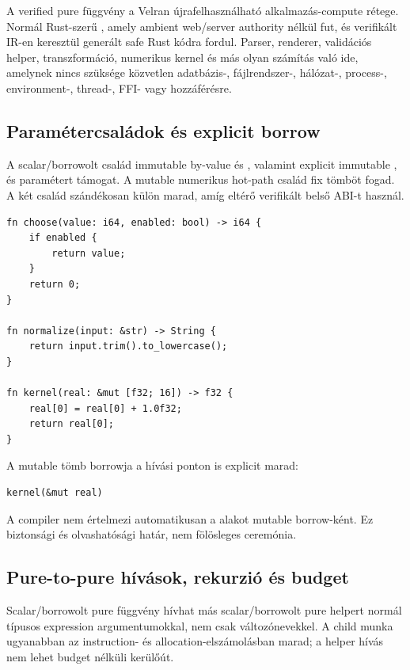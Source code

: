 A verified pure függvény a Velran újrafelhasználható alkalmazás-compute rétege. Normál Rust-szerű , amely ambient web/server authority nélkül fut, és verifikált IR-en keresztül generált safe Rust kódra fordul. Parser, renderer, validációs helper, transzformáció, numerikus kernel és más olyan számítás való ide, amelynek nincs szüksége közvetlen adatbázis-, fájlrendszer-, hálózat-, process-, environment-, thread-, FFI- vagy  hozzáférésre.

\subsection*{Paramétercsaládok és explicit borrow}

A scalar/borrowolt család immutable by-value  és , valamint explicit immutable , \code{\&[String]} és  paramétert támogat. A mutable numerikus hot-path család fix  tömböt fogad. A két család szándékosan külön marad, amíg eltérő verifikált belső ABI-t használ.

\begin{lstlisting}[language=Velran]
fn choose(value: i64, enabled: bool) -> i64 {
    if enabled {
        return value;
    }
    return 0;
}

fn normalize(input: &str) -> String {
    return input.trim().to_lowercase();
}

fn kernel(real: &mut [f32; 16]) -> f32 {
    real[0] = real[0] + 1.0f32;
    return real[0];
}
\end{lstlisting}

A mutable tömb borrowja a hívási ponton is explicit marad:

\begin{lstlisting}[language=Velran]
kernel(&mut real)
\end{lstlisting}

A compiler nem értelmezi automatikusan a  alakot mutable borrow-ként. Ez biztonsági és olvashatósági határ, nem fölösleges ceremónia.

\subsection*{Pure-to-pure hívások, rekurzió és budget}

Scalar/borrowolt pure függvény hívhat más scalar/borrowolt pure helpert normál típusos expression argumentumokkal, nem csak változónevekkel. A child munka ugyanabban az instruction- és allocation-elszámolásban marad; a helper hívás nem lehet budget nélküli kerülőút.

